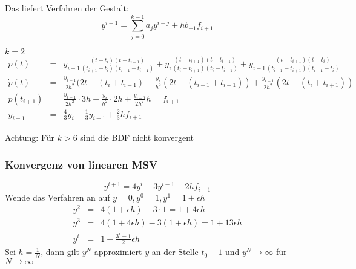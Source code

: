 Das liefert Verfahren der Gestalt:
$$y^{i+1}=\sum_{j=0}^{k-1}a_{j}y^{i-j}+hb_{-1}f_{i+1}$$

\begin{example}
$k=2$
\begin{eqnarray*}
	p(t)&=&y_{i+1}\frac{(t-t_{i})(t-t_{i-1})}{(t_{i+1}-t_{i})(t_{i+1}-t_{i-1})} + y_{i}\frac{(t-t_{i+1})(t-t_{i-1})}{(t_{i}-t_{i+1})(t_{i}-t_{i-1})}
	+y_{i-1}\frac{(t-t_{i+1})(t-t_{i})}{(t_{i-1}-t_{i+1})(t_{i-1}-t_{i})}\\
	\dot p(t)&=&\frac{y_{i+1}}{2h^{2}}(2t-(t_{i}+t_{i-1})-\frac{y_{i}}{h^{2}}(2t-(t_{i-1}+t_{i+1}))+\frac{y_{i-1}}{2h^{2}}(2t-(t_{i}+t_{i+1}))\\
	\dot p(t_{i+1})&=&\frac{y_{i+1}}{2h^{2}}\cdot 3h - \frac{y_{i}}{h^{2}}\cdot 2 h+\frac{y_{i-1}}{2h^{2}}h=f_{i+1}\\
	y_{i+1}&=&\frac{4}{3}y_{i}-\frac{1}{3}y_{i-1}+\frac{2}{3}hf_{i+1}	
\end{eqnarray*}
\end{example}

Achtung: Für $k>6$ sind die BDF nicht konvergent

\subsubsection{Konvergenz von linearen MSV}

\begin{example}
$$y^{i+1}=4y^{i}-3y^{i-1}-2hf_{i-1}$$
Wende das Verfahren an auf $\dot y =0,y^{0}=1,y^{1}=1+\epsilon h$
\begin{eqnarray*}
	y^{2}&=&4(1+\epsilon h)-3\cdot 1 = 1+4\epsilon h\\
	y^{3}&=&4(1+4\epsilon h)-3(1+\epsilon h) = 1+13\epsilon h\\
	y^{i}&=&1+\frac{3^{i}-1}{2}\epsilon h
\end{eqnarray*}
Sei $h=\frac{1}{N}$, dann gilt $y^{N}$ approximiert $y$ an der Stelle $t_{0}+1$ und $y^{N}\rightarrow \infty$ für $N\rightarrow \infty$
\end{example}